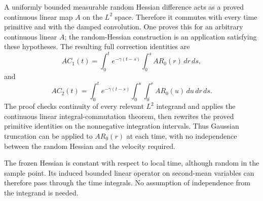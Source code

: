 \documentclass[11pt,a4paper]{article}
\begin{document}
A uniformly bounded measurable random Hessian difference acts as a proved continuous linear map \(A\) on the \(L^{2}\) space. Therefore it commutes with every time primitive and with the damped convolution. One proves this for an arbitrary continuous linear \(A\); the random-Hessian construction is an application satisfying these hypotheses. The resulting full correction identities are \[AC_1(t)=\int_0^te^{-\gamma(t-s)}\int_0^sAR_0(r)\,dr\,ds,\] and \[AC_2(t)=\int_0^te^{-\gamma(t-s)}\int_0^s\int_0^rAR_0(u)\,du\,dr\,ds.\] The proof checks continuity of every relevant \(L^{2}\) integrand and applies the continuous linear integral-commutation theorem, then rewrites the proved primitive identities on the nonnegative integration intervals. Thus Gaussian truncation can be applied to \(AR_0(r)\) at each time, with no independence between the random Hessian and the velocity required.



The frozen Hessian is constant with respect to local time, although random in the sample point. Its induced bounded linear operator on second-mean variables can therefore pass through the time integrals. No assumption of independence from the integrand is needed.
\end{document}
